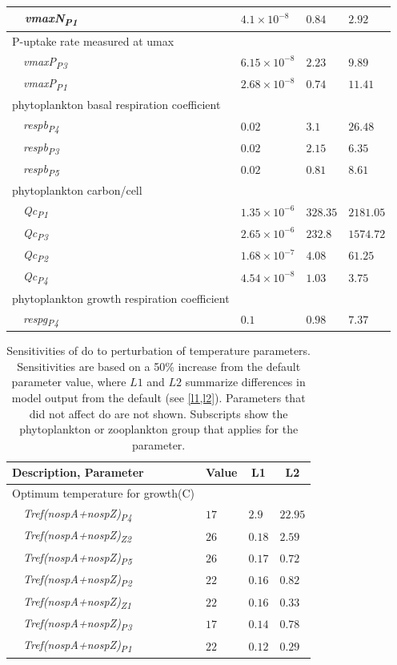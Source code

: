 \documentclass[letterpaper,12pt,oneside]{article}\usepackage[]{graphicx}\usepackage[]{color}
\begin{document}
\begin{table}[!tbp]
{\begin{center}
\begin{tabular}{llll}
~~\textit{vmaxN\textsubscript{P1}}&$4.1\times 10^{-8}$&$0.84$&$2.92$\tabularnewline
\hline
{P-uptake rate measured at umax}&&&\tabularnewline
~~\textit{vmaxP\textsubscript{P3}}&$6.15\times 10^{-8}$&$2.23$&$9.89$\tabularnewline
~~\textit{vmaxP\textsubscript{P1}}&$2.68\times 10^{-8}$&$0.74$&$11.41$\tabularnewline
\hline
{phytoplankton basal respiration coefficient}&&&\tabularnewline
~~\textit{respb\textsubscript{P4}}&$0.02$&$3.1$&$26.48$\tabularnewline
~~\textit{respb\textsubscript{P3}}&$0.02$&$2.15$&$6.35$\tabularnewline
~~\textit{respb\textsubscript{P5}}&$0.02$&$0.81$&$8.61$\tabularnewline
\hline
{phytoplankton carbon/cell}&&&\tabularnewline
~~\textit{Qc\textsubscript{P1}}&$1.35\times 10^{-6}$&$328.35$&$2181.05$\tabularnewline
~~\textit{Qc\textsubscript{P3}}&$2.65\times 10^{-6}$&$232.8$&$1574.72$\tabularnewline
~~\textit{Qc\textsubscript{P2}}&$1.68\times 10^{-7}$&$4.08$&$61.25$\tabularnewline
~~\textit{Qc\textsubscript{P4}}&$4.54\times 10^{-8}$&$1.03$&$3.75$\tabularnewline
\hline
{phytoplankton growth respiration coefficient}&&&\tabularnewline
~~\textit{respg\textsubscript{P4}}&$0.1$&$0.98$&$7.37$\tabularnewline
\hline
\end{tabular}\end{center}}

\end{table}


\begin{table}[!tbp]
{\normalsize
\caption{Sensitivities of \ac{do} to perturbation of temperature parameters.  Sensitivities are based on a 50\% increase from the default parameter value, where $L1$ and $L2$ summarize differences in model output from the default (see \cref{l1,l2}).  Parameters that did not affect \ac{do} are not shown.  Subscripts show the phytoplankton or zooplankton group that applies for the parameter.\label{tab:tempsens}} 
\begin{center}
\begin{tabular}{llll}
\hline\hline
\multicolumn{1}{l}{Description, Parameter}&\multicolumn{1}{c}{Value}&\multicolumn{1}{c}{L1}&\multicolumn{1}{c}{L2}\tabularnewline
\hline
{Optimum temperature for growth(C)}&&&\tabularnewline
~~\textit{Tref(nospA+nospZ)\textsubscript{P4}}&$17$&$2.9$&$22.95$\tabularnewline
~~\textit{Tref(nospA+nospZ)\textsubscript{Z2}}&$26$&$0.18$&$2.59$\tabularnewline
~~\textit{Tref(nospA+nospZ)\textsubscript{P5}}&$26$&$0.17$&$0.72$\tabularnewline
~~\textit{Tref(nospA+nospZ)\textsubscript{P2}}&$22$&$0.16$&$0.82$\tabularnewline
~~\textit{Tref(nospA+nospZ)\textsubscript{Z1}}&$22$&$0.16$&$0.33$\tabularnewline
~~\textit{Tref(nospA+nospZ)\textsubscript{P3}}&$17$&$0.14$&$0.78$\tabularnewline
~~\textit{Tref(nospA+nospZ)\textsubscript{P1}}&$22$&$0.12$&$0.29$\tabularnewline
\hline
\end{tabular}\end{center}}

\end{table}
\end{document}
